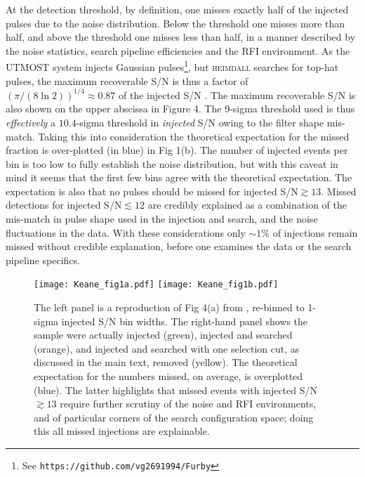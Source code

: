 \documentclass[RNAAS]{aastex62}
\begin{document}
At the detection threshold, by definition, one misses exactly half of the injected pulses due to the noise distribution. Below the threshold one misses more than half, and above the threshold one misses less than half, in a manner described by the noise statistics, search pipeline efficiencies and the RFI environment. As the UTMOST system injects Gaussian pulses\footnote{See \texttt{https://github.com/vg2691994/Furby}}, but \textsc{heimdall} searches for top-hat pulses, the maximum recoverable S/N is thus a factor of $(\pi/(8\ln 2))^{1/4} \approx 0.87$ of the injected S/N \citep{mc03}. The maximum recoverable S/N is also shown on the upper abscissa in Figure 4. The 9-sigma threshold used is thus \textit{effectively} a $10.4$-sigma threshold in \textit{injected} S/N owing to the filter shape mis-match. Taking this into consideration the theoretical expectation for the missed fraction is over-plotted (in blue) in Fig 1(b). The number of injected events per bin is too low to fully establish the noise distribution, but with this caveat in mind it seems that the first few bins agree with the theoretical expectation. The expectation is also that no pulses should be missed for injected S/N$\gtrsim 13$. Missed detections for injected S/N$\lesssim 12$ are credibly explained as a combination of the mis-match in pulse shape used in the injection and search, and the noise fluctuations in the data. With these considerations only $\sim 1$\% of injections remain missed without credible explanation, before one examines the data or the search pipeline specifics.

\begin{figure}%
\begin{center}
\texttt{[image: Keane\_fig1a.pdf]}
\texttt{[image: Keane\_fig1b.pdf]}
\caption{The left panel is a reproduction of Fig 4(a) from \citet{Wael2019}, re-binned to 1-sigma injected S/N bin widths. The right-hand panel shows the sample were actually injected (green), injected and searched (orange), and injected and searched with one selection cut, as discussed in the main text, removed (yellow). The theoretical expectation for the numbers missed, on average, is overplotted (blue). The latter highlights that missed events with injected S/N$\gtrsim 13$ require further scrutiny of the noise and RFI environments, and of particular corners of the search configuration space; doing this all missed injections are explainable.\label{fig:1}}
\end{center}
\end{figure}
\end{document}
